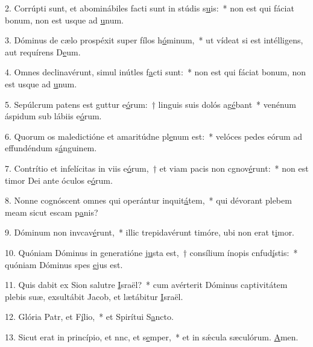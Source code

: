 2. Corrúpti sunt, et abominábiles facti sunt in stúdis s\uline{u}is:~* non est qui fáciat bonum, non est usque ad \uline{u}num.\par 
3. Dóminus de cælo prospéxit super fílos h\uline{ó}minum,~* ut vídeat si est intélligens, aut requírens D\uline{e}um.\par 
4. Omnes declinavérunt, simul inútles f\uline{a}cti sunt:~* non est qui fáciat bonum, non est usque ad \uline{u}num.\par 
5. Sepúlcrum patens est guttur e\uline{ó}rum:~† linguis suis dolós ag\uline{é}bant~* venénum áspidum sub lábiis e\uline{ó}rum.\par 
6. Quorum os maledictióne et amaritúdne pl\uline{e}num est:~* velóces pedes eórum ad effundéndum s\uline{á}nguinem.\par 
7. Contrítio et infelícitas in viis e\uline{ó}rum,~† et viam pacis non cgnov\uline{é}runt:~* non est timor Dei ante óculos e\uline{ó}rum.\par 
8. Nonne cognóscent omnes qui operántur inquit\uline{á}tem,~* qui dévorant plebem meam sicut escam p\uline{a}nis?\par 
9. Dóminum non invcav\uline{é}runt,~* illic trepidavérunt timóre, ubi non erat t\uline{i}mor.\par 
10. Quóniam Dóminus in generatióne \uline{ju}sta est,~† consílium ínopis cnfud\uline{í}stis:~* quóniam Dóminus spes \uline{e}jus est.\par 
11. Quis dabit ex Sion salutre \uline{I}sraël?~* cum avérterit Dóminus captivitátem plebis suæ, exsultábit Jacob, et lætábitur \uline{I}sraël.\par 
12. Glória Patr, et F\uline{í}lio,~* et Spirítui S\uline{a}ncto.\par 
13. Sicut erat in princípio, et nnc, et s\uline{e}mper,~* et in sǽcula sæculórum. \uline{A}men.\par 
